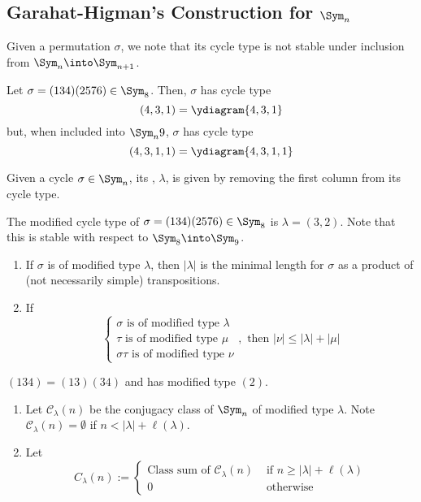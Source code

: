 \documentclass[11pt,leqno,oneside]{amsbook}
\newcommand{\CC}{\mathcal{C}} %
\numberwithin{thm}{section}
\begin{document}
\subsection{Garahat-Higman's Construction for \(\Sym_n\)}
Given a permutation \(\sigma\), we note that its cycle type is not
stable under inclusion from \(\Sym_n \into \Sym_{n+1}\).
\begin{example}
  Let \(\sigma = (134)(2576) \in \Sym_8\). Then, \(\sigma\) has cycle
  type \[
    (4,3,1) = \ydiagram{4,3,1}
  \]
  but, when included into \(\Sym_n9\), \(\sigma\) has cycle type \[
    (4,3,1,1) = \ydiagram{4,3,1,1}
  \]
\end{example}
\begin{defn}
  Given a cycle \(\sigma \in \Sym_n\), its ,
  \(\lambda\), is given by removing the first column from its cycle
  type. 
\end{defn}
\begin{example}
  The modified cycle type of \(\sigma = (134)(2576) \in \Sym_8\) is
  \(\lambda = (3,2)\). Note that this is stable with respect to
  \(\Sym_8 \into \Sym_9\).
\end{example}
\begin{prop}
  \begin{enumerate}
  \item If \(\sigma\) is of modified type \(\lambda\), then
    \(|\lambda|\) is the minimal length for \(\sigma\) as a product of
    (not necessarily simple) transpositions.
  \item If \[
      \begin{cases}
        \sigma \text{ is of modified type }\lambda\\
        \tau \text{ is of modified type }\mu\\
        \sigma\tau \text{ is of modified type }\nu
      \end{cases},
      \text{ then } |\nu| \leq |\lambda| + |\mu|
    \]
  \end{enumerate}
\end{prop}
\begin{example}
  \((134) = (13)(34)\) and has modified type \((2)\).
\end{example}
\begin{defn}
  \begin{enumerate}
  \item Let \(\CC_\lambda(n)\) be the conjugacy class of \(\Sym_n\) of
    modified type \(\lambda\). Note \(\CC_\lambda(n) = \emptyset\) if
    \(n < |\lambda|+\ell(\lambda)\).
  \item Let \[
      C_\lambda(n) :=
      \begin{cases}
        \text{Class sum of }\CC_\lambda(n) & \text{ if } n \geq
        |\lambda|+\ell(\lambda) \\
        0 & \text{ otherwise}
      \end{cases}
    \]
  \end{enumerate}
\end{defn}
\end{document}
